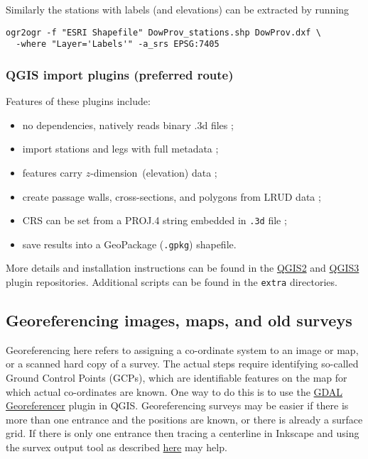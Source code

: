 \documentclass[]{article}
\providecommand{\tightlist}{%
  \setlength{\itemsep}{0pt}\setlength{\parskip}{0pt}}
\newcommand{\zdimension}{$z$-dimension}
\begin{document}
Similarly the stations with labels (and elevations) can be extracted by
running

\begin{verbatim}
ogr2ogr -f "ESRI Shapefile" DowProv_stations.shp DowProv.dxf \
  -where "Layer='Labels'" -a_srs EPSG:7405
\end{verbatim}

\subsubsection{QGIS import plugins (preferred route)}\label{import-using-qgis-plugin}

Features of these plugins include:
\begin{itemize}
\tightlist
\item no dependencies, natively reads binary .3d files ;
\item import stations and legs with full metadata ;
\item features carry \zdimension\ (elevation) data ;
\item create passage walls, cross-sections, and polygons from LRUD data ;
\item CRS can be set from a PROJ.4 string embedded in \verb}.3d} file ;
\item save results into a GeoPackage (\verb+.gpkg+) shapefile.
\end{itemize}

More details and installation instructions can be
found in the
\href{https://github.com/patrickbwarren/qgis-survex-import}{QGIS2} and
\href{https://github.com/patrickbwarren/qgis3-survex-import}{QGIS3}
plugin repositories.
Additional scripts can be found in the \verb+extra+  directories.

\subsection{Georeferencing images, maps, and old
surveys}\label{georeferencing-images-maps-and-old-surveys}

Georeferencing here refers to assigning a co-ordinate system to an image
or map, or a scanned hard copy of a survey. The actual steps require
identifying so-called Ground Control Points (GCPs), which are
identifiable features on the map for which actual co-ordinates are
known. One way to do this is to use the
\href{https://docs.qgis.org/2.8/en/docs/user_manual/plugins/plugins_georeferencer.html}{GDAL
Georeferencer} plugin in QGIS.
Georeferencing surveys may be easier if there is more than one entrance
and the positions are known, or there is already a surface grid. If
there is only one entrance then tracing a centerline in Inkscape and
using the survex output tool as described
\href{https://github.com/patrickbwarren/inkscape-survex-export}{here}
may help.
\end{document}

